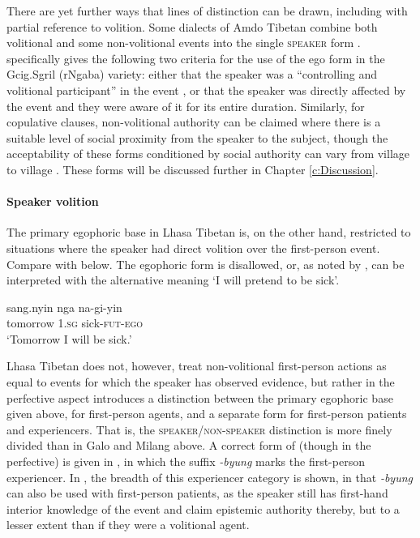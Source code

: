 There are yet further ways that lines of distinction can be drawn, including with partial reference to volition. Some dialects of Amdo Tibetan combine both volitional and some non-volitional events into the single \textsc{speaker} form \cite{Tribur2019}.  specifically gives the following two criteria for the use of the ego form in the Gcig.Sgril (rNgaba) variety: either that the speaker was a ``controlling and volitional participant'' in the event \cite[383]{Tribur2019}, or that the speaker was directly affected by the event and they were aware of it for its entire duration. Similarly, for copulative clauses, non-volitional authority can be claimed where there is a suitable level of social proximity from the speaker to the subject, though the acceptability of these forms conditioned by social authority can vary from village to village \cite[213]{Tribur2019}. These forms will be discussed further in Chapter \ref{c:Discussion}.

\paragraph{Speaker volition}
The primary egophoric base in Lhasa Tibetan is, on the other hand, restricted to situations where the speaker had direct volition over the first-person event. Compare  with  below. The egophoric form is disallowed, or, as noted by , can be interpreted with the alternative meaning `I will pretend to be sick'.

\begin{exe}
        \ex \label{e:Description:LhasaVolition}
        \gll * sang.nyin nga na-gi-yin \\
        {} tomorrow \textsc{1.sg} sick-\textsc{fut}-\textsc{ego} \\
        \glt `Tomorrow I will be sick.' \cite[Lhasa Tibetan,][164]{Garrett2001}
\end{exe}

Lhasa Tibetan does not, however, treat non-volitional first-person actions as equal to events for which the speaker has observed evidence, but rather in the perfective aspect introduces a distinction between the primary egophoric base given above, for first-person agents, and a separate form for first-person patients and experiencers. That is, the \textsc{speaker}/\textsc{non-speaker} distinction is more finely divided than in Galo and Milang above. A correct form of  (though in the perfective) is given in , in which the suffix \textit{-byung} marks the first-person experiencer. In , the breadth of this experiencer category is shown, in that \textit{-byung} can also be used with first-person patients, as the speaker still has first-hand interior knowledge of the event and claim epistemic authority thereby, but to a lesser extent than if they were a volitional agent.

